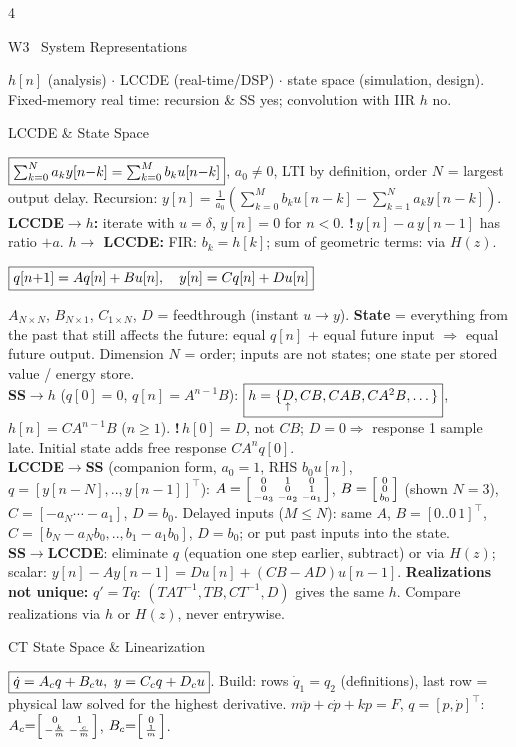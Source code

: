 \documentclass[a4paper,landscape]{article}
\newcommand{\sect}[1]{\par\vspace{1pt}\noindent\colorbox{secblue}{\parbox{\dimexpr\linewidth-2\fboxsep}{\color{white}\bfseries\fontsize{6.8}{7.6}\selectfont\strut #1}}\par\vspace{0.4pt}}
\newcommand{\sub}[1]{\par\vspace{0.6pt}\noindent\colorbox{subblue}{\parbox{\dimexpr\linewidth-2\fboxsep}{\bfseries\strut #1}}\par\vspace{0.2pt}}
\newcommand{\warn}[1]{{\color{warnred}\textbf{!}\,#1}}
\newcommand{\up}[1]{\underset{\uparrow}{#1}}
\newcommand{\T}{^{\!\top}}
\newcommand{\bx}[1]{\fbox{$\textstyle #1$}}
\newcommand{\eqc}[1]{\par\vspace{0.2pt}\centerline{$#1$}\par\vspace{0.2pt}}
\begin{document}
\begin{multicols*}{4}
\sect{W3 \ System Representations}
$h[n]$ (analysis) $\cdot$ LCCDE (real-time/DSP) $\cdot$ state space (simulation, design). Fixed-memory real time: recursion \& SS yes; convolution with IIR $h$ no.
\sub{LCCDE \& State Space}
$\bx{\sum_{k=0}^Na_ky[n{-}k]=\sum_{k=0}^Mb_ku[n{-}k]}$, $a_0{\ne}0$, LTI by definition, order $N$ = largest output delay. Recursion: $y[n]=\frac1{a_0}(\sum_{k=0}^Mb_ku[n{-}k]-\sum_{k=1}^Na_ky[n{-}k])$.
\textbf{LCCDE$\to h$:} iterate with $u{=}\delta$, $y[n]{=}0$ for $n{<}0$. \warn{$y[n]-a\,y[n{-}1]$ has ratio $+a$.} \textbf{$h\to$ LCCDE:} FIR: $b_k{=}h[k]$; sum of geometric terms: via $H(z)$.
\eqc{\bx{q[n{+}1]=Aq[n]+Bu[n],\quad y[n]=Cq[n]+Du[n]}}
$A_{N\times N}$, $B_{N\times1}$, $C_{1\times N}$, $D$ = feedthrough (instant $u\to y$). \textbf{State} = everything from the past that still affects the future: equal $q[n]$ + equal future input $\Rightarrow$ equal future output. Dimension $N$ = order; inputs are not states; one state per stored value / energy store.\\
\textbf{SS$\to h$} ($q[0]{=}0$, $q[n]{=}A^{n-1}B$): $\bx{h=\{\up D,CB,CAB,CA^2B,\dots\}}$, $h[n]=CA^{n-1}B$ ($n{\ge}1$). \warn{$h[0]=D$, not $CB$}; $D{=}0\Rightarrow$ response 1 sample late. Initial state adds free response $CA^nq[0]$.\\
\textbf{LCCDE$\to$SS} (companion form, $a_0{=}1$, RHS $b_0u[n]$, $q=[y[n{-}N],..,y[n{-}1]]\T$):
$A=\begin{bsmallmatrix}0&1&0\\0&0&1\\-a_3&-a_2&-a_1\end{bsmallmatrix}$, $B=\begin{bsmallmatrix}0\\0\\b_0\end{bsmallmatrix}$ (shown $N{=}3$), $C=[-a_N\cdots-a_1]$, $D=b_0$.
Delayed inputs ($M{\le}N$): same $A$, $B=[0..0\,1]\T$, $C=[b_N{-}a_Nb_0,..,b_1{-}a_1b_0]$, $D=b_0$; or put past inputs into the state.\\
\textbf{SS$\to$LCCDE}: eliminate $q$ (equation one step earlier, subtract) or via $H(z)$; scalar: $y[n]-Ay[n{-}1]=Du[n]+(CB-AD)u[n{-}1]$.
\textbf{Realizations not unique:} $q'=Tq$: $(TAT^{-1},TB,CT^{-1},D)$ gives the same $h$. Compare realizations via $h$ or $H(z)$, never entrywise.
\sub{CT State Space \& Linearization}
$\bx{\dot q=A_cq+B_cu,\ y=C_cq+D_cu}$. Build: rows $\dot q_1{=}q_2$ (definitions), last row = physical law solved for the highest derivative. $m\ddot p{+}c\dot p{+}kp{=}F$, $q{=}[p,\dot p]\T$: $A_c{=}\begin{bsmallmatrix}0&1\\-\frac km&-\frac cm\end{bsmallmatrix}$, $B_c{=}\begin{bsmallmatrix}0\\\frac1m\end{bsmallmatrix}$.\\

\end{multicols*}
\end{document}
